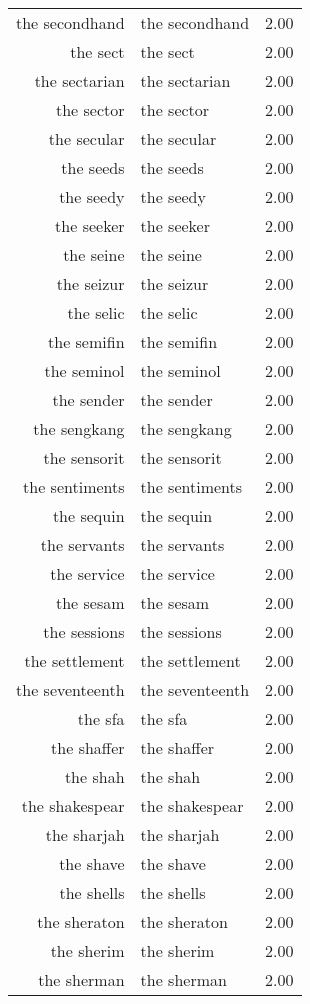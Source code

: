 \begin{table}[ht]
\begin{tabular}{rlr}
  the secondhand & the secondhand & 2.00 \\ 
  the sect & the sect & 2.00 \\ 
  the sectarian & the sectarian & 2.00 \\ 
  the sector & the sector & 2.00 \\ 
  the secular & the secular & 2.00 \\ 
  the seeds & the seeds & 2.00 \\ 
  the seedy & the seedy & 2.00 \\ 
  the seeker & the seeker & 2.00 \\ 
  the seine & the seine & 2.00 \\ 
  the seizur & the seizur & 2.00 \\ 
  the selic & the selic & 2.00 \\ 
  the semifin & the semifin & 2.00 \\ 
  the seminol & the seminol & 2.00 \\ 
  the sender & the sender & 2.00 \\ 
  the sengkang & the sengkang & 2.00 \\ 
  the sensorit & the sensorit & 2.00 \\ 
  the sentiments & the sentiments & 2.00 \\ 
  the sequin & the sequin & 2.00 \\ 
  the servants & the servants & 2.00 \\ 
  the service & the service & 2.00 \\ 
  the sesam & the sesam & 2.00 \\ 
  the sessions & the sessions & 2.00 \\ 
  the settlement & the settlement & 2.00 \\ 
  the seventeenth & the seventeenth & 2.00 \\ 
  the sfa & the sfa & 2.00 \\ 
  the shaffer & the shaffer & 2.00 \\ 
  the shah & the shah & 2.00 \\ 
  the shakespear & the shakespear & 2.00 \\ 
  the sharjah & the sharjah & 2.00 \\ 
  the shave & the shave & 2.00 \\ 
  the shells & the shells & 2.00 \\ 
  the sheraton & the sheraton & 2.00 \\ 
  the sherim & the sherim & 2.00 \\ 
  the sherman & the sherman & 2.00 \\ 

\end{tabular}
\end{table}
